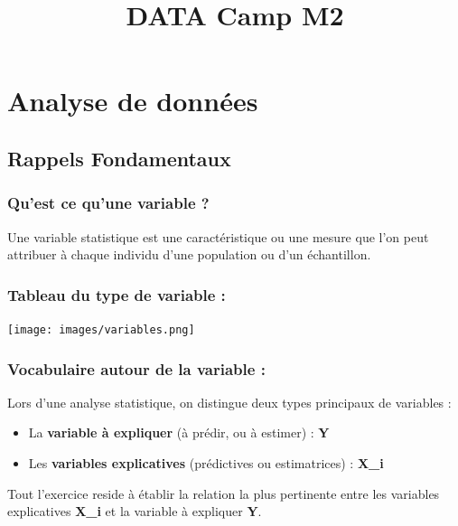 \documentclass[
  letterpaper,
  DIV=11,
  numbers=noendperiod]{scrartcl}
\title{DATA Camp M2}
\author{}
\date{}
\providecommand{\tightlist}{%
  \setlength{\itemsep}{0pt}\setlength{\parskip}{0pt}}\usepackage{longtable,booktabs,array}
\begin{document}
\maketitle


\section{Analyse de données}\label{analyse-de-donnuxe9es}

\subsection{Rappels Fondamentaux}\label{rappels-fondamentaux}

\subsubsection{Qu'est ce qu'une variable
?}\label{quest-ce-quune-variable}

Une variable statistique est une caractéristique ou une mesure que l'on
peut attribuer à chaque individu d'une population ou d'un échantillon.

\subsubsection{Tableau du type de variable
:}\label{tableau-du-type-de-variable}

\begin{center}
\texttt{[image: images/variables.png]}
\end{center}

\subsubsection{Vocabulaire autour de la variable
:}\label{vocabulaire-autour-de-la-variable}

Lors d'une analyse statistique, on distingue deux types principaux de
variables :

\begin{itemize}
\tightlist
\item
  La \textbf{variable à expliquer} (à prédir, ou à estimer) : \textbf{Y}
\item
  Les \textbf{variables explicatives} (prédictives ou estimatrices) :
  \textbf{X\_i}
\end{itemize}

Tout l'exercice reside à établir la relation la plus pertinente entre
les variables explicatives \textbf{X\_i} et la variable à expliquer
\textbf{Y}.
\end{document}
